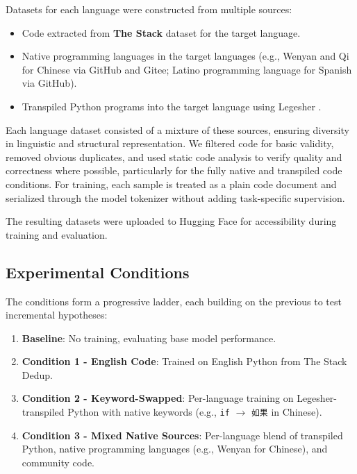 \documentclass[conference]{IEEEtran}
\begin{document}
Datasets for each language were constructed from multiple sources:

\begin{itemize} \item Code extracted from \textbf{The Stack} dataset \cite{kocetkov2022stack3tbpermissively} for the target language. \item Native programming languages in the target languages (e.g., Wenyan \cite{Huang_wenyan_A_Programming_2019} and Qi \cite{Yang_Qi_A_Lightweight_2021} for Chinese via GitHub and Gitee; Latino \cite{Lenguaje_Latino_Contributors_Latino_Lenguaje_de_2024} programming language for Spanish via GitHub). \item Transpiled Python programs into the target language using Legesher \cite{Edgar_Legesher_Because_language_2026}. \end{itemize}

Each language dataset consisted of a mixture of these sources, ensuring diversity in linguistic and structural representation. We filtered code for basic validity, removed obvious duplicates, and used static code analysis to verify quality and correctness where possible, particularly for the fully native and transpiled code conditions. For training, each sample is treated as a plain code document and serialized through the model tokenizer without adding task-specific supervision.

The resulting datasets were uploaded to Hugging Face \cite{legesher_language_decoded} for accessibility during training and evaluation.

\subsection{Experimental Conditions}
The conditions form a progressive ladder, each building on the previous to test incremental hypotheses:

\begin{enumerate}
\item \textbf{Baseline}: No training, evaluating base model performance.
\item \textbf{Condition 1 - English Code}: Trained on English Python from The Stack Dedup.
\item \textbf{Condition 2 - Keyword-Swapped}: Per-language training on Legesher-transpiled Python with native keywords (e.g., \texttt{if} $\rightarrow$ \texttt{如果} in Chinese).
\item \textbf{Condition 3 - Mixed Native Sources}: Per-language blend of transpiled Python, native programming languages (e.g., Wenyan for Chinese), and community code.
\end{enumerate}
\end{document}
